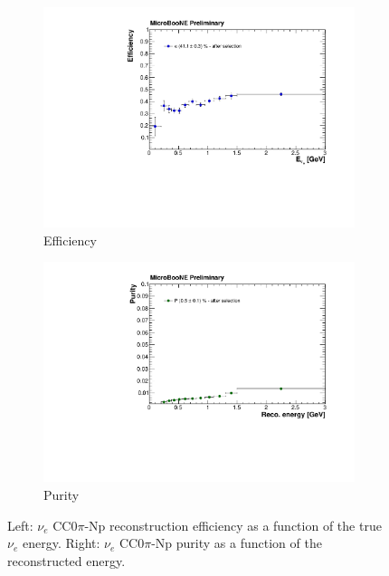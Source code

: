 \begin{figure}
  \begin{subfigure}{0.48\textwidth}
    \includegraphics[width=\linewidth]{figures/eff.pdf}
    \caption{Efficiency} 
  \end{subfigure}
    \begin{subfigure}{0.48\textwidth}
    \includegraphics[width=\linewidth]{figures/purity.pdf}
    \caption{Purity} 
  \end{subfigure}
  \caption{Left: $\nu_{e}$ CC$0\pi$-Np reconstruction efficiency as a function of the true $\nu_{e}$ energy. Right: $\nu_{e}$ CC$0\pi$-Np purity as a function of the reconstructed energy.}
  \label{fig:effpurity}
\end{figure}

